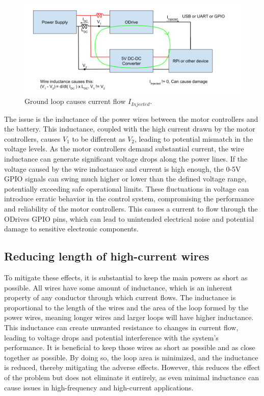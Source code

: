     \begin{figure}[h]
    \includegraphics[width=\textwidth]{contents/figures/ground_loop_bad.png}
    \caption{Ground loop causes current flow $I_{Injected}$.}
    \label{ground_loop_bad}
    \end{figure}
    
    The issue is the inductance of the power wires between the motor controllers and the battery. This inductance, coupled with the high current drawn by the motor controllers, causes $V_1$ to be different as $V_2$, leading to potential mismatch in the voltage levels. As the motor controllers demand substantial current, the wire inductance can generate significant voltage drops along the power lines. If the voltage caused by the wire inductance and current is high enough, the 0-5V GPIO signals can swing much higher or lower than the defined voltage range, potentially exceeding safe operational limits. These fluctuations in voltage can introduce erratic behavior in the control system, compromising the performance and reliability of the motor controllers. This causes a current to flow through the ODrives GPIO pins, which can lead to unintended electrical noise and potential damage to sensitive electronic components.

    \clearpage
    \subsection{Reducing length of high-current wires}
    
    To mitigate these effects, it is substantial to keep the main powers as short as possible. All wires have some amount of inductance, which is an inherent property of any conductor through which current flows. The inductance is proportional to the length of the wires and the area of the loop formed by the power wires, meaning longer wires and larger loops will have higher inductance. This inductance can create unwanted resistance to changes in current flow, leading to voltage drops and potential interference with the system's performance. It is beneficial to keep those wires as short as possible and as close together as possible. By doing so, the loop area is minimized, and the inductance is reduced, thereby mitigating the adverse effects. However, this reduces the effect of the problem but does not eliminate it entirely, as even minimal inductance can cause issues in high-frequency and high-current applications.
    

